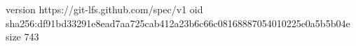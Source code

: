 version https://git-lfs.github.com/spec/v1
oid sha256:df91bd33291e8ead7aa725cab412a23b6c66c08168887054010225e0a5b5b04e
size 743
